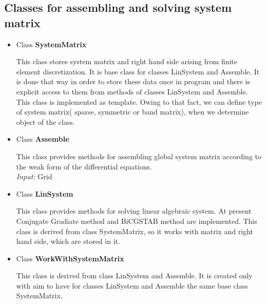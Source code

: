 \subsection{ Classes for assembling and solving system matrix }
\begin{itemize}
%
\item{ Class {\bf SystemMatrix}} \\
\begin{print}
 This class stores system matrix and right hand side arising from finite element discretization. It is base class for classes LinSystem and Assemble. It is done that way in order to store these data once in program and there is
 explicit access to them from methods of classes LinSystem and Assemble. This class is implemented as template. Owing to that fact, we can define type of system matrix( sparse, symmetric or band matrix), when we determine object of the class. 
\end{print}
%
\item{ Class {\bf Assemble}} \\
\begin{print}
This class provides methods for assembling global system matrix according to the weak form of the differential equations. \\
{\it Input: } Grid 
\end{print}
%
\item{ Class {\bf LinSystem}} \\
\begin{print}
 This class provides methods for solving linear algebraic system. At present Conjugate Gradiate method and BiCGSTAB method are implemented. This class is derived from class SystemMatrix, so it works with matrix and right hand side, which are stored in it. 
\end{print}
%
\item{ Class {\bf WorkWithSystemMatrix}} \\
\begin{print}
 This class is derived from class LinSystem and Assemble. It is created only with aim to have for classes LinSystem and Assemble the same base class SystemMatrix.
\end{print}
\end{itemize}
%
